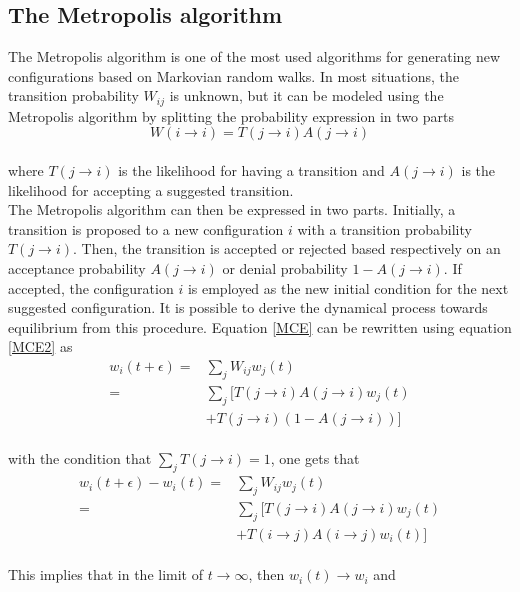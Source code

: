 \documentclass[%
reprint,nofootinbib,
amsmath,amssymb,
aps,
]{revtex4-1}
\begin{document}
\subsection*{The Metropolis algorithm} \noindent 
The Metropolis algorithm is one of the most used algorithms for generating new configurations based on Markovian random walks. In most situations, the transition probability $W_{ij}$ is unknown, but it can be modeled using the Metropolis algorithm by splitting the probability expression in two parts \\ 
\begin{equation}\label{MCE2}
	W(i\rightarrow i) = T(j\rightarrow i)A(j\rightarrow i)
\end{equation} \\ 
where $T(j\rightarrow i)$ is the likelihood for having a transition and $A(j\rightarrow i)$ is the likelihood for accepting a suggested transition. \\ \indent 
The Metropolis algorithm can then be expressed in two parts. Initially, a transition is proposed to a new configuration $i$ with a transition probability $T(j\rightarrow i)$. Then, the transition is accepted or rejected based respectively on an acceptance probability $A(j \rightarrow i)$ or denial probability $1-A(j \rightarrow i)$. If accepted, the configuration $i$ is employed as the new initial condition for the next suggested configuration. It is possible to derive the dynamical process towards equilibrium from this procedure. Equation \ref{MCE} can be rewritten using equation \ref{MCE2} as \\ 
\begin{align}
	w_i(t+\epsilon) =& \sum_j W_{ij}w_j(t) \nonumber\\ =& \sum_j [T(j\rightarrow i)A(j\rightarrow i)w_j(t) \nonumber\\&+ T(j\rightarrow i)(1-A(j\rightarrow i))]
\end{align} \\ 
with the condition that $\sum_j T(j\rightarrow i) = 1$, one gets that \\ 
\begin{align}
w_i(t+\epsilon) - w_i(t) =& \sum_j W_{ij}w_j(t)  \nonumber\\ =  & \sum_j [T(j\rightarrow i)A(j\rightarrow i)w_j(t) \nonumber \\ &+ T(i\rightarrow j)A(i\rightarrow j)w_i(t)]
\end{align} \\ 
This implies that in the limit of $t\rightarrow \infty$, then $w_i(t) \rightarrow w_i$ and \\
\end{document}
